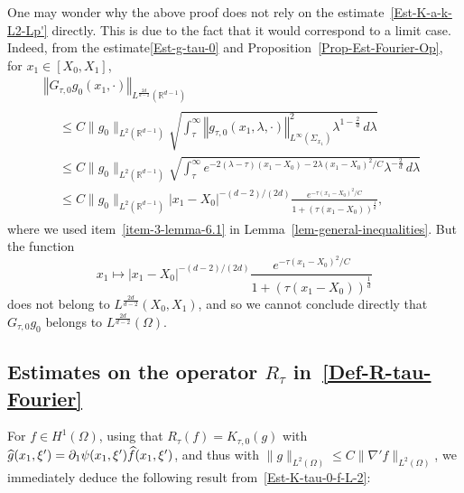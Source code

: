\documentclass[AHL,Unicode,longabstracts]{cedram}
\newcommand*\R{\mathbb{R}}
\newcommand{\norm}[1]{\left\Vert#1\right\Vert}
\renewcommand{\leq}{\leqslant}
\renewcommand{\hat}{\widehat}
\let\oldhat\hat
\renewcommand*{\hat}[1]{\mathchoice{\widehat{#1}}{\widehat{#1}}{\oldhat{#1}}{\oldhat{#1}}}
\begin{document}
\begin{rema}
One may wonder why the above proof does not rely on the estimate~\eqref{Est-K-a-k-L2-Lp'} directly. This is due to the fact that it would correspond to a limit case. Indeed, from the estimate\eqref{Est-g-tau-0} and Proposition~\ref{Prop-Est-Fourier-Op}, for $x_1 \in [X_0, X_1]$,
\begin{multline*}
 \norm{{G_{\tau,0} g_0}(x_1, \cdot) }_{L^{\frac{2d}{d-2}}\left(\R^{d-1}\right)}\\
\begin{aligned}
&\leq C \| g_0 \|_{L^2\left(\R^{d-1}\right)}
\sqrt{\int_\tau^\infty \norm{ g_{\tau,0}(x_1,\lambda, \cdot)}^2_{L^\infty(\Sigma_{x_1})} \lambda^{1 - \frac{2}{d}} \, d\lambda}
\\
&
\leq C\| g_0 \|_{L^2\left(\R^{d-1}\right)}
\sqrt{\int_\tau^\infty e^{-2 (\lambda - \tau)(x_1 - X_0) - 2 \lambda (x_1 - X_0)^2/C}
\lambda^{- \frac{2}{d}} \, d\lambda}
\\
& \leq C \| g_0 \|_{L^2\left(\R^{d-1}\right)} |x_1 -X_0|^{-(d-2)/(2d)} \frac{e^{ - \tau (x_1 - X_0)^2/C}}{1+ (\tau (x_1 - X_0))^{\frac{1}{d}}},
\end{aligned}
\end{multline*}
where we used item~\eqref{item-3-lemma-6.1} in Lemma~\ref{lem-general-inequalities}. But the function
\[
x_1 \mapsto |x_1 -X_0|^{-(d-2)/(2d)} \frac{e^{ - \tau (x_1 - X_0)^2/C}}{1+ (\tau (x_1 - X_0))^{\frac{1}{d}}}
\]
does not belong to $L^{\frac{2d}{d-2}}(X_0, X_1)$, and so we cannot conclude directly that $G_{\tau, 0} g_0 $ belongs to $L^{\frac{2d}{d-2}}(\Omega)$.
\end{rema}

\subsection{Estimates on the operator \texorpdfstring{$R_\tau$}{R tau} in~\eqref{Def-R-tau-Fourier}}

For $f \in H^1(\Omega)$, using that $R_\tau (f) = K_{\tau,0} (g)$ with $ \hat g(x_1, \xi') = \partial_1 \psi(x_1, \xi') \hat f(x_1, \xi')$, and thus with $\| g \|_{L^2(\Omega)} \leq C \| \nabla' f \|_{L^2(\Omega)}$, we immediately deduce the following result from~\eqref{Est-K-tau-0-f-L-2}:
\end{document}
